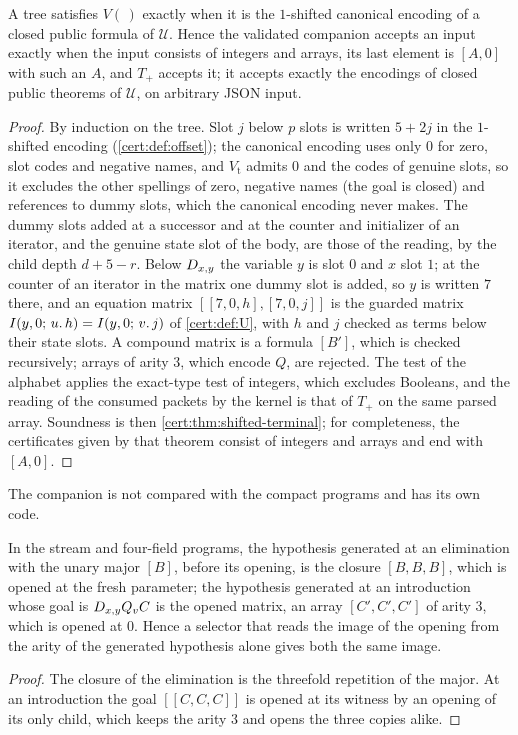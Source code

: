 \begin{proposition}\label{cert:prop:shifted-validated}
A tree satisfies $V(\,)$ exactly when it is the $1$-shifted canonical encoding of
a closed public formula of $\mathcal U$. Hence the validated companion accepts an
input exactly when the input consists of integers and arrays, its last element
is $[A,0]$ with such an $A$, and $T_{+}$ accepts it; it accepts exactly the
encodings of closed public theorems of $\mathcal U$, on arbitrary JSON input.
\end{proposition}
\begin{proof}
By induction on the tree. Slot $j$ below $p$ slots is written $5+2j$ in the
$1$-shifted encoding (\cref{cert:def:offset}); the canonical encoding uses only
$0$ for zero, slot codes and negative names, and $V_{\mathrm t}$ admits $0$ and
the codes of genuine slots, so it excludes the other spellings of zero, negative
names (the goal is closed) and references to dummy slots, which the canonical
encoding never makes. The dummy slots added at a successor and at the counter
and initializer of an iterator, and the genuine state slot of the body, are
those of the reading, by the child depth $d+5-r$. Below $D_{x,y}$ the variable
$y$ is slot $0$ and $x$ slot $1$; at the counter of an iterator in the matrix one
dummy slot is added, so $y$ is written $7$ there, and an equation matrix
$[[7,0,h],[7,0,j]]$ is the guarded matrix $I(y,0;\,u.\,h)=I(y,0;\,v.\,j)$ of
\cref{cert:def:U}, with $h$ and $j$ checked as terms below their state slots. A
compound matrix is a formula $[B']$, which is checked recursively; arrays of arity
$3$, which encode $Q$, are rejected. The test of the alphabet applies the
exact-type test of integers, which excludes Booleans, and the reading of the
consumed packets by the kernel is that of $T_{+}$ on the same parsed array.
Soundness is then \cref{cert:thm:shifted-terminal}; for completeness, the
certificates given by that theorem consist of integers and arrays and end with
$[A,0]$.
\end{proof}

The companion is not compared with the compact programs and has its own code.

\begin{proposition}\label{cert:prop:mode-collision}
In the stream and four-field programs, the hypothesis generated at an
elimination with the unary major $[B]$, before its opening, is the closure
$[B,B,B]$, which is opened at the fresh parameter; the hypothesis generated at an
introduction whose goal is $D_{x,y}Q_{v}C$ is the opened matrix, an array
$[C',C',C']$ of arity $3$, which is opened at $0$. Hence a selector that reads
the image of the opening from the arity of the generated hypothesis alone gives
both the same image.
\end{proposition}
\begin{proof}
The closure of the elimination is the threefold repetition of the major. At an
introduction the goal $[[C,C,C]]$ is opened at its witness by an opening of its
only child, which keeps the arity $3$ and opens the three copies alike.
\end{proof}


